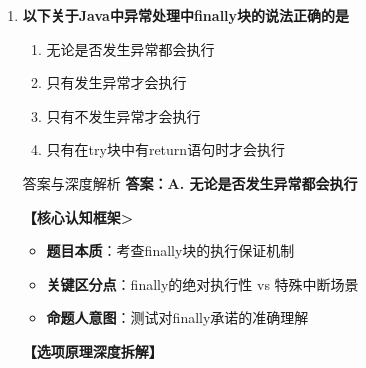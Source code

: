 \documentclass[12pt, a4paper]{ctexart}
\begin{document}
\begin{enumerate}[label=\textbf{\arabic*.}]
	      \vspace{1em}

	\item \textbf{以下关于Java中异常处理中finally块的说法正确的是}
	      \begin{enumerate}[label=\Alph*.]
		      \item 无论是否发生异常都会执行
		      \item 只有发生异常才会执行
		      \item 只有不发生异常才会执行
		      \item 只有在try块中有return语句时才会执行
	      \end{enumerate}

	      \begin{bluebox}{答案与深度解析}
		      \textbf{答案：A. 无论是否发生异常都会执行}

		      \textbf{【核心认知框架>}
		      \begin{itemize}[label={}, leftmargin=*, nosep]
			      \item \textbf{题目本质}：考查finally块的执行保证机制
			      \item \textbf{关键区分点}：finally的绝对执行性 vs 特殊中断场景
			      \item \textbf{命题人意图}：测试对finally承诺的准确理解
		      \end{itemize}

		      \textbf{【选项原理深度拆解】}


\end{bluebox}
\end{enumerate}
\end{document}
